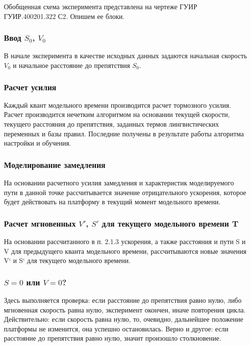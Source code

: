 Обобщенная схема эксперимента представлена на чертеже ГУИР ГУИР.400201.322 С2. Опишем ее блоки.

\subsubsection{Ввод $S_0$, $V_0$}

В начале эксперимента в качестве исходных данных задаются начальная скорость $V_0$ и начальное расстояние до препятствия $S_0$.

\subsubsection{Расчет усилия }

Каждый квант модельного времени производится расчет тормозного усилия. Расчет производится нечетким алгоритмом на основании текущей скорости, текущего расстояния до препятствия, заданных термов лингвистических переменных и базы правил. Последние получены в результате работы алгоритма настройки и обучения.

\subsubsection{ Моделирование замедления}

На основании расчетного усилия  замедления и характеристик моделируемого пути в данной точке рассчитывается значение отрицательного ускорения, которое будет действовать на платформу в текущий момент модельного времени.

\subsubsection{Расчет мгновенных $V'$, $S'$ для текущего модельного времени T}

На основании рассчитанного в п. 2.1.3 ускорения, а также расстояния и пути S и V для предыдущего кванта модельного времени, рассчитываются новые значения V` и S` для текущего модельного времени.

\subsubsection{ $S = 0$ или $V = 0$? }
Здесь выполняется проверка: если расстояние до препятствия равно нулю, либо мгновенная скорость равна нулю, эксперимент окончен, иначе повторения цикла. Действительно: если скорость равна нулю, то, очевидно, дальнейшее положение платформы не изменится, она успешно остановилась. Верно и другое: если расстояние до препятствия равно нулю, значит произошло столкновение.

